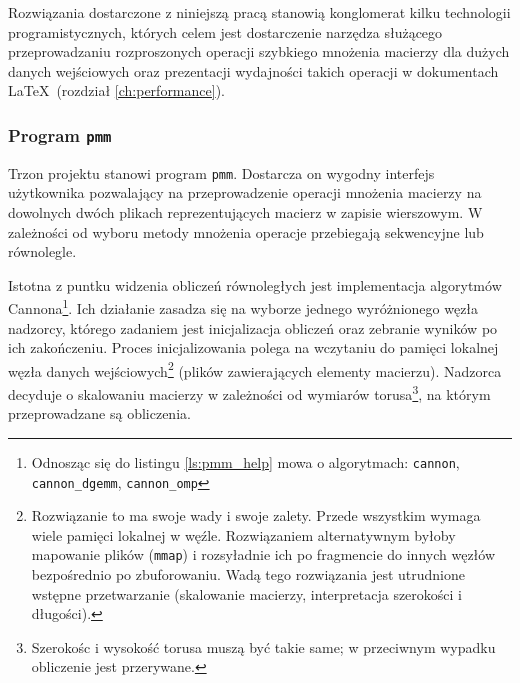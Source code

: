 Rozwiązania dostarczone z niniejszą pracą stanowią konglomerat kilku technologii programistycznych, których celem jest dostarczenie narzędza służącego przeprowadzaniu rozproszonych operacji szybkiego mnożenia macierzy dla dużych danych wejściowych oraz prezentacji wydajności takich operacji w dokumentach \LaTeX \, (rozdział \ref{ch:performance}). 

\subsubsection{Program \texttt{pmm}}

Trzon projektu stanowi program \texttt{pmm}. Dostarcza on wygodny interfejs użytkownika pozwalający na przeprowadzenie operacji mnożenia macierzy na dowolnych dwóch plikach reprezentujących macierz w zapisie wierszowym. W zależności od wyboru metody mnożenia operacje przebiegają sekwencyjne lub równolegle.

Istotna z puntku widzenia obliczeń równoległych jest implementacja algorytmów Cannona\footnote{Odnosząc się do listingu \ref{ls:pmm_help} mowa o algorytmach: \texttt{cannon}, \texttt{cannon\_dgemm}, \texttt{cannon\_omp}}. Ich działanie zasadza się na wyborze jednego wyróżnionego węzła nadzorcy, którego zadaniem jest inicjalizacja obliczeń oraz zebranie wyników po ich zakończeniu. Proces inicjalizowania polega na wczytaniu do pamięci lokalnej węzła danych wejściowych\footnote{Rozwiązanie to ma swoje wady i swoje zalety. Przede wszystkim wymaga wiele pamięci lokalnej w węźle. Rozwiązaniem alternatywnym byłoby mapowanie plików (\texttt{mmap}) i rozsyładnie ich po fragmencie do innych węzłów bezpośrednio po zbuforowaniu. Wadą tego rozwiązania jest utrudnione wstępne przetwarzanie (skalowanie macierzy, interpretacja szerokości i długości).} (plików zawierających elementy macierzu). Nadzorca decyduje o skalowaniu macierzy w zależności od wymiarów torusa\footnote{Szerokośc i wysokość torusa muszą być takie same; w przeciwnym wypadku obliczenie jest przerywane.}, na którym przeprowadzane są obliczenia. 


